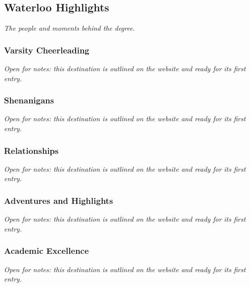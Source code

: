 \documentclass{article}
\begin{document}
\subsection{Waterloo Highlights}\label{sec:waterloo-highlights}
\textit{The people and moments behind the degree.}

\subsubsection{Varsity Cheerleading}\label{sec:varsity-cheerleading}
\textit{Open for notes: this destination is outlined on the website and ready for its first entry.}

\subsubsection{Shenanigans}\label{sec:waterloo-highlights-shenanigans}
\textit{Open for notes: this destination is outlined on the website and ready for its first entry.}

\subsubsection{Relationships}\label{sec:relationships}
\textit{Open for notes: this destination is outlined on the website and ready for its first entry.}

\subsubsection{Adventures and Highlights}\label{sec:adventures-and-highlights}
\textit{Open for notes: this destination is outlined on the website and ready for its first entry.}

\subsubsection{Academic Excellence}\label{sec:academic-excellence}
\textit{Open for notes: this destination is outlined on the website and ready for its first entry.}

\end{document}
